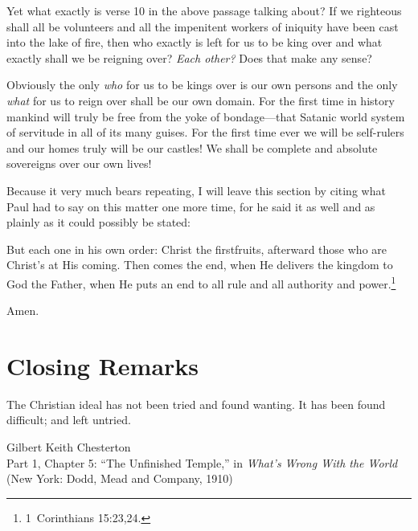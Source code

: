 \documentclass[letterpaper,12pt]{article}
\newenvironment{squote}
  {\small\quote}
  {\endquote\normalsize}
\begin{document}
Yet what exactly is verse 10 in the above passage talking about? If we righteous shall all be volunteers and all the impenitent workers of iniquity have been cast into the lake of fire, then who exactly is left for us to be king over and what exactly shall we be reigning over? \emph{Each other?} Does that make any sense?

Obviously the only \emph{who} for us to be kings over is our own persons and the only \emph{what} for us to reign over shall be our own domain. For the first time in history mankind will truly be free from the yoke of bondage---that Satanic world system of servitude in all of its many guises. For the first time ever we will be self-rulers and our homes truly will be our castles! We shall be complete and absolute sovereigns over our own lives!

Because it very much bears repeating, I will leave this section by citing what Paul had to say on this matter one more time, for he said it as well and as plainly as it could possibly be stated:

\begin{squote}
But each one in his own order: Christ the firstfruits, afterward those who are Christ's at His coming. Then comes the end, when He delivers the kingdom to God the Father, when He puts an end to all rule and all authority and power.\footnote{1~Corinthians 15:23,24.}
\end{squote}

Amen.

\section{Closing Remarks}
\label{sec:ClosingRemarks}

\epigraph{The Christian ideal has not been tried and found wanting. It has been found difficult; and left untried.}{Gilbert Keith Chesterton\\
\footnotesize Part 1, Chapter 5: ``The Unfinished Temple,'' in \emph{What's Wrong With the World} (New York: Dodd, Mead and Company, 1910)}
\end{document}
